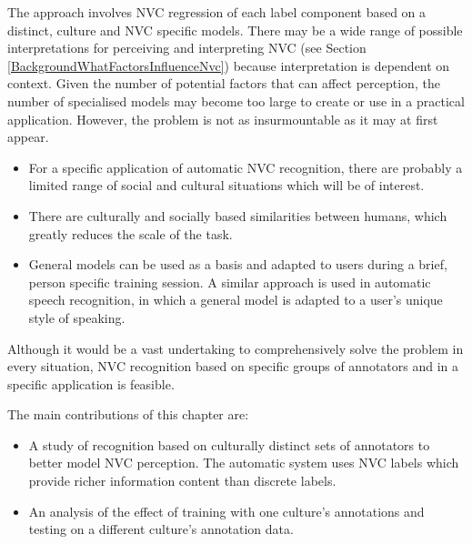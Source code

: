 The approach involves \ac{NVC} regression of each label component based on a distinct, culture and \ac{NVC} specific models. There may be a wide range of possible interpretations for perceiving and interpreting \ac{NVC} (see Section \ref{BackgroundWhatFactorsInfluenceNvc}) because interpretation is dependent on context. 
Given the number of potential factors that can affect perception, the number of specialised models may become too large to create or use in a practical application.
However, the problem is not as insurmountable as it may at first appear. 
\begin{itemize}
 \item For a specific application of automatic \ac{NVC} recognition, there are probably a limited range of social and cultural situations which will be of interest.
 \item There are culturally and socially based similarities between humans, which greatly reduces the scale of the task.
 \item General models can be used as a basis and adapted to users during a brief, person specific training session. A similar approach is used in automatic speech recognition, in which a general model is adapted to a user's unique style of speaking.
\end{itemize}

Although it would be a vast undertaking to comprehensively solve the problem in every situation, \ac{NVC} recognition based on specific groups of annotators and in a specific application is feasible.

The main contributions of this chapter are:
\begin{itemize}
\item A study of recognition based on culturally distinct sets of annotators to better model \culturallySpecific \ac{NVC} perception. The automatic system uses \continuous \ac{NVC} labels which provide richer information content than discrete labels.
\item An analysis of the effect of training with one culture's annotations and testing on a different culture's annotation data.
\end{itemize}

